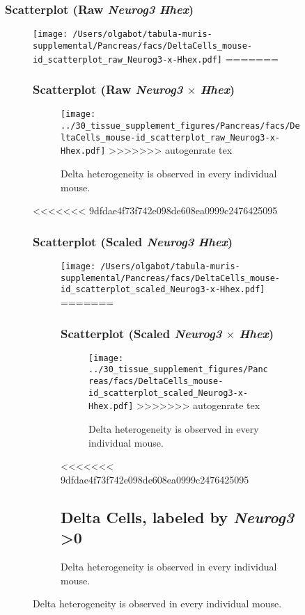 \subsubsection{Scatterplot (Raw \emph{Neurog3} \texttimes \emph{Hhex})}
\begin{figure}[h]
\centering
\texttt{[image: /Users/olgabot/tabula-muris-supplemental/Pancreas/facs/DeltaCells\_mouse-id\_scatterplot\_raw\_Neurog3-x-Hhex.pdf]}
=======
\subsubsection{Scatterplot (Raw \emph{Neurog3} $\times$ \emph{Hhex})}
\begin{figure}[h]
\centering
\texttt{[image: ../30\_tissue\_supplement\_figures/Pancreas/facs/DeltaCells\_mouse-id\_scatterplot\_raw\_Neurog3-x-Hhex.pdf]}
>>>>>>> autogenrate tex

\caption{Delta heterogeneity is observed in every individual mouse.
}
\end{figure}


\clearpage

<<<<<<< 9dfdae4f73f742e098de608ea0999c2476425095
\subsubsection{Scatterplot (Scaled \emph{Neurog3} \texttimes \emph{Hhex})}
\begin{figure}[h]
\centering
\texttt{[image: /Users/olgabot/tabula-muris-supplemental/Pancreas/facs/DeltaCells\_mouse-id\_scatterplot\_scaled\_Neurog3-x-Hhex.pdf]}
=======
\subsubsection{Scatterplot (Scaled \emph{Neurog3} $\times$ \emph{Hhex})}
\begin{figure}[h]
\centering
\texttt{[image: ../30\_tissue\_supplement\_figures/Pancreas/facs/DeltaCells\_mouse-id\_scatterplot\_scaled\_Neurog3-x-Hhex.pdf]}
>>>>>>> autogenrate tex

\caption{Delta heterogeneity is observed in every individual mouse.
}
\end{figure}


\clearpage

<<<<<<< 9dfdae4f73f742e098de608ea0999c2476425095
\subsection{Delta Cells, labeled by \emph{Neurog3} \textgreater 0}


\end{figure}
\end{figure}
